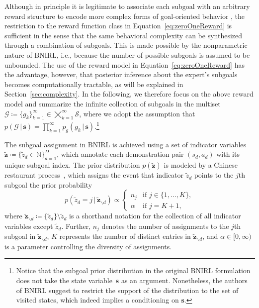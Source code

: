 \documentclass[twoside,11pt]{article}
\newcommand{\p}{p}
\newcommand{\given}{\,\vert\,}
\newcommand{\without}{\backslash}
\newcommand{\defeq}{\coloneqq}
\newcommand{\eqkomma}{,}
\newcommand{\ie}{i.e.}
\begin{document}
Although %
in principle it is legitimate to associate each subgoal with an arbitrary reward structure %
to encode more complex forms of goal-oriented behavior \citep[see, for example,][]{ranchod2015nonparametric}, the restriction to the reward function class in Equation~\eqref{eq:zeroOneReward} is sufficient in the sense that the same behavioral complexity can be synthesized through a combination of subgoals. This is made possible by the nonparametric nature of BNIRL, \ie, %
because the number of possible subgoals is assumed to be unbounded. The use of the reward model in Equation~\eqref{eq:zeroOneReward} has the advantage, however, that posterior inference about the expert's subgoals %
becomes computationally tractable, as will be explained in Section~\ref{sec:complexity}.
%
%
In the following, we therefore focus on the above reward model %
and
%
summarize the infinite collection of subgoals in the multiset $\mathcal{G}\defeq\{g_k\}_{k=1}^\infty\in %
\bigtimes_{k=1}^\infty\mathcal{S}$,
%
where we adopt the assumption that 
$\p(\mathcal{G} \given \mathbf{s})=\prod_{k=1}^\infty\p_g(g_k \given \mathbf{s})$.\footnote{\label{foot:conditioning}Notice that the subgoal prior distribution in the original BNIRL formulation does not take the state variable~$\mathbf{s}$ as an argument. Nonetheless, the authors of BNIRL suggest to restrict the support of the distribution %
	to the set of visited states, which indeed implies a conditioning on $\mathbf{s}$.}
%
%

The subgoal assignment in BNIRL 
is achieved using a set of indicator variables $\mathbf{\tilde{z}}\defeq\{\tilde{z}_d\in\mathbb{N}\}_{d=1}^D$, which annotate each demonstration pair $(s_d,a_d)$ with its %
unique subgoal index. The prior distribution $\p(\mathbf{\tilde{z}})$ %
is modeled by a Chinese restaurant process~\citep[CRP,][]{aldous1985exchangeability}, which assigns the event that indicator $\tilde{z}_d$ %
points to the $j$th subgoal the prior probability
\begin{equation*}
\p(\tilde{z}_d=j \given \mathbf{\tilde{z}}_{\without d}) \propto
\begin{cases}
n_j & \text{if } j \in \{1,\ldots,K\}\eqkomma \\
\alpha & \text{if } j = K+1 \eqkomma
\end{cases}
\end{equation*}
where $\mathbf{\tilde{z}}_{\without d}\defeq \{\tilde{z}_d\}\setminus \tilde{z}_d$ is a shorthand notation for the collection of all indicator variables except $\tilde{z}_d$. Further, $n_j$ %
denotes the number of assignments to the $j$th subgoal in $\mathbf{\tilde{z}}_{\without d}$, $K$ represents the number of distinct entries in $\mathbf{\tilde{z}}_{\without d}$, and $\alpha\in[0,\infty)$ %
is a parameter controlling the diversity of assignments.
\end{document}
